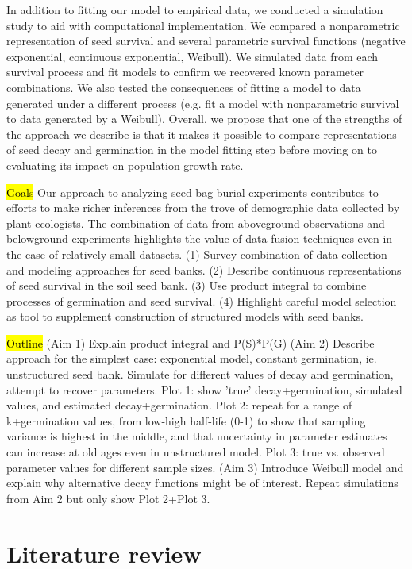 \documentclass[12pt, oneside, titlepage]{article}   	%
\begin{document}
In addition to fitting our model to empirical data, we conducted a simulation study to aid with computational implementation. We compared a nonparametric representation of seed survival and several parametric survival functions (negative exponential, continuous exponential, Weibull). We simulated data from each survival process and fit models to confirm we recovered known parameter combinations. We also tested the consequences of fitting a model to data generated under a different process (e.g. fit a model with nonparametric survival to data generated by a Weibull). Overall, we propose that one of the strengths of the approach we describe is that it makes it possible to compare representations of seed decay and germination in the model fitting step before moving on to evaluating its impact on population growth rate. 

\hl{Goals} Our approach to analyzing seed bag burial experiments contributes to efforts to make richer inferences from the trove of demographic data collected by plant ecologists. The combination of data from aboveground observations and belowground experiments highlights the value of data fusion techniques even in the case of relatively small datasets. (1) Survey combination of data collection and modeling approaches for seed banks. (2) Describe continuous representations of seed survival in the soil seed bank. (3) Use product integral to combine processes of germination and seed survival. (4) Highlight careful model selection as tool to supplement construction of structured models with seed banks.

\hl{Outline} (Aim 1) Explain product integral and P(S)*P(G) (Aim 2) Describe approach for the simplest case: exponential model, constant germination, ie. unstructured seed bank. Simulate for different values of decay and germination, attempt to recover parameters. Plot 1: show 'true' decay+germination, simulated values, and estimated decay+germination. Plot 2: repeat for a range of k+germination values, from low-high half-life (0-1) to show that sampling variance is highest in the middle, and that uncertainty in parameter estimates can increase at old ages even in unstructured model. Plot 3: true vs. observed parameter values for different sample sizes. (Aim 3) Introduce Weibull model and explain why alternative decay functions might be of interest. Repeat simulations from Aim 2 but only show Plot 2+Plot 3.


\section{Literature review}
\end{document}
